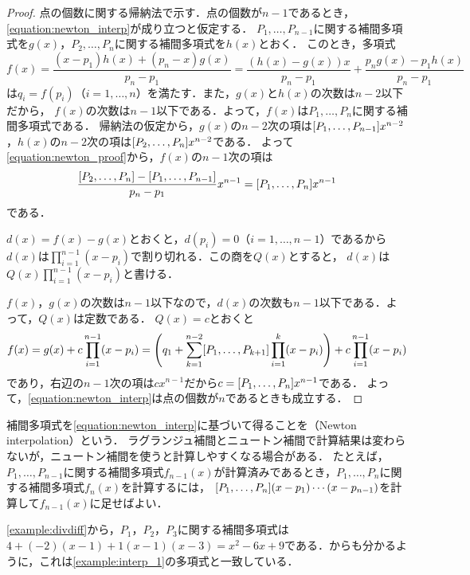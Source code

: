 \documentclass[../../numcalc]{subfiles}
\begin{document}
\begin{proof}
点の個数に関する帰納法で示す．点の個数が\(n-1\)であるとき，\cref{equation:newton_interp}が成り立つと仮定する．
\(P_1,\dots,P_{n-1}\)に関する補間多項式を\(g(x)\)，\(P_2,\dots,P_n\)に関する補間多項式を\(h(x)\)とおく．
このとき，多項式
\begin{equation}
  \label{equation:newton_proof}
  f(x) = \frac{(x-p_1)h(x)+(p_n-x)g(x)}{p_n-p_1}
  = \frac{(h(x)-g(x))x}{p_n-p_1}+\frac{p_ng(x)-p_1h(x)}{p_n-p_1}  
\end{equation}
は\(q_i=f(p_i)\)（\(i=1,\dots,n\)）を満たす．また，\(g(x)\)と\(h(x)\)の次数は\(n-2\)以下だから，
\(f(x)\)の次数は\(n-1\)以下である．よって，\(f(x)\)は\(P_1,\dots,P_n\)に関する補間多項式である．
帰納法の仮定から，\(g(x)\)の\(n-2\)次の項は\(\divdiff{P_1,\dots,P_{n-1}}x^{n-2}\)，\(h(x)\)の\(n-2\)次の項は\(\divdiff{P_2,\dots,P_n}x^{n-2}\)である．
よって\cref{equation:newton_proof}から，\(f(x)\)の\(n-1\)次の項は
\[
  \frac{\divdiff{P_2,\dots,P_n}-\divdiff{P_1,\dots,P_{n-1}}}{p_n-p_1}x^{n-1} = \divdiff{P_1,\dots,P_n}x^{n-1}
\]
である．

\(d(x)=f(x)-g(x)\)とおくと，\(d(p_i)=0\)（\(i=1,\dots,n-1\)）であるから
\(d(x)\)は\(\prod_{i=1}^{n-1}(x-p_i)\)で割り切れる．この商を\(Q(x)\)とすると，
\(d(x)\)は\(Q(x)\prod_{i=1}^{n-1}(x-p_i)\)と書ける．

\(f(x)\)，\(g(x)\)の次数は\(n-1\)以下なので，\(d(x)\)の次数も\(n-1\)以下である．よって，\(Q(x)\)は定数である．
\(Q(x)=c\)とおくと
\[
  f(x) = g(x)+c\prod_{i=1}^{n-1}(x-p_i)
  = \pqty*{q_1+\sum_{k=1}^{n-2}\divdiff{P_1,\dots,P_{k+1}}\prod_{i=1}^k(x-p_i)}+c\prod_{i=1}^{n-1}(x-p_i)
\]
であり，右辺の\(n-1\)次の項は\(cx^{n-1}\)だから\(c=\divdiff{P_1,\dots,P_n}x^{n-1}\)である．
よって，\cref{equation:newton_interp}は点の個数が\(n\)であるときも成立する．
\end{proof}

補間多項式を\cref{equation:newton_interp}に基づいて得ることを（Newton interpolation）という．
ラグランジュ補間とニュートン補間で計算結果は変わらないが，ニュートン補間を使うと計算しやすくなる場合がある．
たとえば，\(P_1,\dots,P_{n-1}\)に関する補間多項式\(f_{n-1}(x)\)が計算済みであるとき，\(P_1,\dots,P_n\)に関する補間多項式\(f_n(x)\)を計算するには，
\(\divdiff{P_1,\dots,P_n}(x-p_1)\dotsm(x-p_{n-1})\)を計算して\(f_{n-1}(x)\)に足せばよい．

\begin{example}
\cref{example:divdiff}から，\(P_1\)，\(P_2\)，\(P_3\)に関する補間多項式は
\(4+(-2)(x-1)+1(x-1)(x-3)=x^2-6x+9\)である．からも分かるように，これは\cref{example:interp_1}の多項式と一致している．
\end{example}
\end{document}
